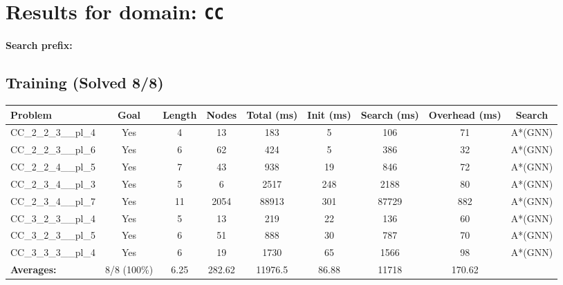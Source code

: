 \documentclass{article}
\begin{document}
\section*{Results for domain: \texttt{CC}}
\textbf{Search prefix:} 
\\[0.5cm]
\subsection*{Training (Solved 8/8)}
\begin{tabular}{lcccccccc}
\toprule
Problem & Goal & Length & Nodes & Total (ms) & Init (ms) & Search (ms) & Overhead (ms) & Search \\
\midrule
CC\_2\_2\_3\_\_pl\_4 & Yes & 4 & 13 & 183 & 5 & 106 & 71 & A*(GNN) \\
CC\_2\_2\_3\_\_pl\_6 & Yes & 6 & 62 & 424 & 5 & 386 & 32 & A*(GNN) \\
CC\_2\_2\_4\_\_pl\_5 & Yes & 7 & 43 & 938 & 19 & 846 & 72 & A*(GNN) \\
CC\_2\_3\_4\_\_pl\_3 & Yes & 5 & 6 & 2517 & 248 & 2188 & 80 & A*(GNN) \\
CC\_2\_3\_4\_\_pl\_7 & Yes & 11 & 2054 & 88913 & 301 & 87729 & 882 & A*(GNN) \\
CC\_3\_2\_3\_\_pl\_4 & Yes & 5 & 13 & 219 & 22 & 136 & 60 & A*(GNN) \\
CC\_3\_2\_3\_\_pl\_5 & Yes & 6 & 51 & 888 & 30 & 787 & 70 & A*(GNN) \\
CC\_3\_3\_3\_\_pl\_4 & Yes & 6 & 19 & 1730 & 65 & 1566 & 98 & A*(GNN) \\
\textbf{Averages:} & 8/8 (100\%) & 6.25 & 282.62 & 11976.5 & 86.88 & 11718 & 170.62 & \\
\bottomrule
\end{tabular}
\\[0.7cm]
\end{document}
